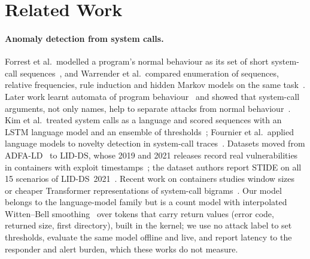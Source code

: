 \section{Related Work}\label{sec:related}

\paragraph{Anomaly detection from system calls.} Forrest et al.\ modelled a program's normal behaviour as its set of
short system-call sequences~\cite{forrest1996}, and Warrender et al.\ compared enumeration of sequences, relative
frequencies, rule induction and hidden Markov models on the same task~\cite{warrender1999}. Later work learnt automata
of program behaviour~\cite{sekar2001} and showed that system-call arguments, not only names, help to separate attacks
from normal behaviour~\cite{mutz2006,maggi2010}. Kim et al.\ treated system calls as a language and scored sequences
with an LSTM language model and an ensemble of thresholds~\cite{kim2016}; Fournier et al.\ applied language models to
novelty detection in system-call traces~\cite{fournier2023}. Datasets moved from ADFA-LD~\cite{creech2013} to LID-DS,
whose 2019 and 2021 releases record real vulnerabilities in containers with exploit timestamps~\cite{grimmer2019,
grimmer2022}; the dataset authors report STIDE on all 15 scenarios of LID-DS~2021~\cite{grimmer2022}. Recent work on
containers studies window sizes~\cite{castanhel2020} or cheaper Transformer representations of system-call
bigrams~\cite{bortolini2025}. Our model belongs to the language-model family but is a count model with interpolated
Witten--Bell smoothing~\cite{witten1991,chen1999} over tokens that carry return values (error code, returned size,
first directory), built in the kernel; we use no attack label to set thresholds, evaluate the same model offline and
live, and report latency to the responder and alert burden, which these works do not measure.

